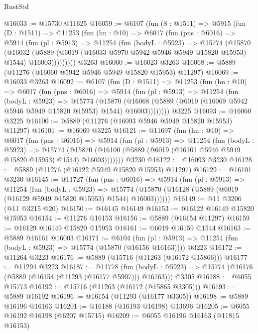\begin{lexlean}{RustStd}
\begin{coremodule}
@16033 := @15730 @11625
@16059 := @6107
    (fun (S : @1511) =>
    @5915
      (fun (D : @1511) =>
      @11253
        (fun (hn : @10) =>
        @6017
          (fun (pns : @6016) =>
          @5914
            (fun (pl : @5913) =>
            @11254
              (fun (bodyL : @5923) =>
              @15774
                (@15870
                  (@16032
                    (@5889
                      (@6019 (@16033 @5970 @5942 @5946 @5949 @15820 @15953) @1544)
                      @16003)))))))))
    @3263
@16060 := @16023 @3263
@16068 := @5889 (@11276 (@16060 @5942 @5946 @5949 @15820 @15953) @11297)
@16069 := @16033 @3263
@16092 := @6107
    (fun (D : @1511) =>
    @11253
      (fun (hn : @10) =>
      @6017
        (fun (pns : @6016) =>
        @5914
          (fun (pl : @5913) =>
          @11254
            (fun (bodyL : @5923) =>
            @15774
              (@15870
                (@16068 (@5889 (@6019 (@16069 @5942 @5946 @5949 @15820 @15953) @1544) @16003))))))))
    @3225
@16093 := @16060 @3225
@16100 := @5889 (@11276 (@16093 @5946 @5949 @15820 @15953) @11297)
@16101 := @16069 @3225
@16121 := @11697
    (fun (hn : @10) =>
    @6017
      (fun (pns : @6016) =>
      @5914
        (fun (pl : @5913) =>
        @11254
          (fun (bodyL : @5923) =>
          @15774
            (@15870 (@16100 (@5889 (@6019 (@16101 @5946 @5949 @15820 @15953) @1544) @16003)))))))
    @3230
@16122 := @16093 @3230
@16128 := @5889 (@11276 (@16122 @5949 @15820 @15953) @11297)
@16129 := @16101 @3230
@16145 := @11727
    (fun (pns : @6016) =>
    @5914
      (fun (pl : @5913) =>
      @11254
        (fun (bodyL : @5923) =>
        @15774 (@15870 (@16128 (@5889 (@6019 (@16129 @5949 @15820 @15953) @1544) @16003))))))
@16149 := @11 @3206 (@11 @3215 @20)
@16150 := @16145 @16149
@16153 := @16122 @16149 @15820 @15953
@16154 := @11276 @16153
@16156 := @5889 (@16154 @11297)
@16159 := @16129 @16149 @15820 @15953
@16161 := @6019 @16159 @1544
@16163 := @5889 @16161 @16003
@16171 := @6104
    (fun (pl : @5913) => @11254 (fun (bodyL : @5923) => @15774 (@15870 (@16156 @16163))))
    @3223
@16172 := @11264 @3223
@16176 := @5889 (@15716 (@11263 (@16172 @15866)))
@16177 := @11294 @3223
@16187 := @11778
    (fun (bodyL : @5923) => @15774 (@16176 (@5889 (@16154 (@11293 (@16177 @5907))) @16163)))
    @3305
@16188 := @6055 @15773
@16192 := @15716 (@11263 (@16172 (@15865 @3305)))
@16193 := @5889 @16192
@16196 := @16154 (@11293 (@16177 @3305))
@16198 := @5889 @16196 @16163
@16201 := @16188 (@16193 @16198) @13696
@16205 := @6055 @16192 @16198 (@6207 @15715)
@16209 := @6055 @16196 @16163 (@11815 @16153)

\end{coremodule}
\end{lexlean}
